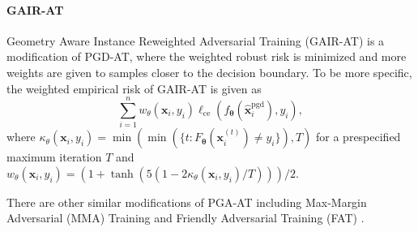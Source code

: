 \documentclass[nohyperref]{article}
\theoremstyle{plain}
\theoremstyle{definition}
\theoremstyle{remark}
\begin{document}
\paragraph{GAIR-AT}
Geometry Aware Instance Reweighted Adversarial Training (GAIR-AT) \citep{zhang2021geometry} 
is a modification of PGD-AT, where
the weighted robust risk is minimized and
more weights are given to samples closer to the
decision boundary. To be more specific, the weighted empirical risk of GAIR-AT is given as
\begin{equation*}
    \sum\limits_{i=1}^n w_{\theta}(\bm{x}_i, y_i) \ell_{\text{ce}}(f_{\bm{\theta}}(\widehat{\bm{x}}^{\text{pgd}}_i), y_i),
\end{equation*}
where $\kappa_{\theta}(\bm{x}_i, y_i) = \min \left( \min (\{t : F_{\bm{\theta}}(\bm{x}_i^{(t)}) \neq y_i \}), T \right)$ for a prespecified maximum iteration $T$ and $w_{\theta}(\bm{x}_i, y_i)= (1+\operatorname{tanh}(5(1-2\kappa_{\theta}(\bm{x}_i, y_i)/T))) / 2$.

There are other similar modifications of PGA-AT 
including Max-Margin Adversarial (MMA) Training  \citep{ding2020mma} and Friendly Adversarial Training (FAT) \citep{zhang2020attacks}. 


\end{document}
